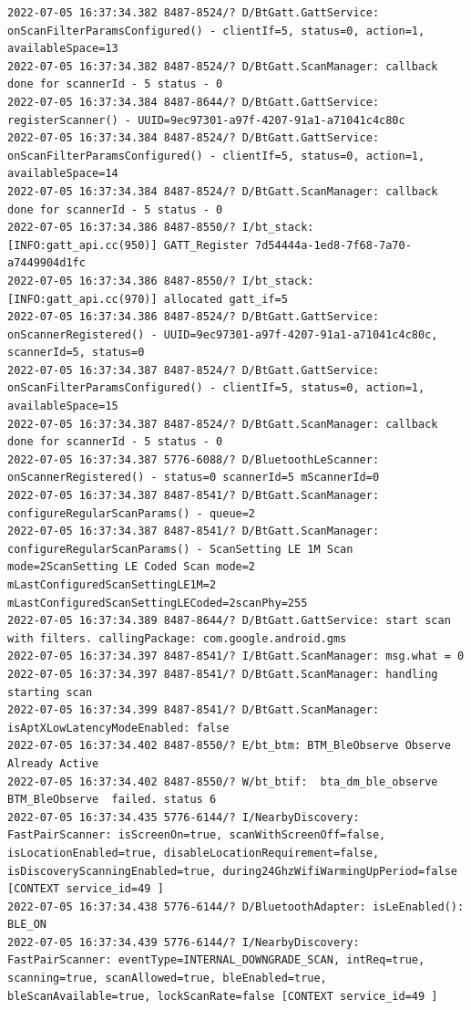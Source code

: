 \documentclass[a4paper,12pt]{book}
\begin{document}
\begin{lstlisting}
2022-07-05 16:37:34.382 8487-8524/? D/BtGatt.GattService: onScanFilterParamsConfigured() - clientIf=5, status=0, action=1, availableSpace=13
2022-07-05 16:37:34.382 8487-8524/? D/BtGatt.ScanManager: callback done for scannerId - 5 status - 0
2022-07-05 16:37:34.384 8487-8644/? D/BtGatt.GattService: registerScanner() - UUID=9ec97301-a97f-4207-91a1-a71041c4c80c
2022-07-05 16:37:34.384 8487-8524/? D/BtGatt.GattService: onScanFilterParamsConfigured() - clientIf=5, status=0, action=1, availableSpace=14
2022-07-05 16:37:34.384 8487-8524/? D/BtGatt.ScanManager: callback done for scannerId - 5 status - 0
2022-07-05 16:37:34.386 8487-8550/? I/bt_stack: [INFO:gatt_api.cc(950)] GATT_Register 7d54444a-1ed8-7f68-7a70-a7449904d1fc
2022-07-05 16:37:34.386 8487-8550/? I/bt_stack: [INFO:gatt_api.cc(970)] allocated gatt_if=5
2022-07-05 16:37:34.386 8487-8524/? D/BtGatt.GattService: onScannerRegistered() - UUID=9ec97301-a97f-4207-91a1-a71041c4c80c, scannerId=5, status=0
2022-07-05 16:37:34.387 8487-8524/? D/BtGatt.GattService: onScanFilterParamsConfigured() - clientIf=5, status=0, action=1, availableSpace=15
2022-07-05 16:37:34.387 8487-8524/? D/BtGatt.ScanManager: callback done for scannerId - 5 status - 0
2022-07-05 16:37:34.387 5776-6088/? D/BluetoothLeScanner: onScannerRegistered() - status=0 scannerId=5 mScannerId=0
2022-07-05 16:37:34.387 8487-8541/? D/BtGatt.ScanManager: configureRegularScanParams() - queue=2
2022-07-05 16:37:34.387 8487-8541/? D/BtGatt.ScanManager: configureRegularScanParams() - ScanSetting LE 1M Scan mode=2ScanSetting LE Coded Scan mode=2 mLastConfiguredScanSettingLE1M=2 mLastConfiguredScanSettingLECoded=2scanPhy=255
2022-07-05 16:37:34.389 8487-8644/? D/BtGatt.GattService: start scan with filters. callingPackage: com.google.android.gms
2022-07-05 16:37:34.397 8487-8541/? I/BtGatt.ScanManager: msg.what = 0
2022-07-05 16:37:34.397 8487-8541/? D/BtGatt.ScanManager: handling starting scan
2022-07-05 16:37:34.399 8487-8541/? D/BtGatt.ScanManager: isAptXLowLatencyModeEnabled: false
2022-07-05 16:37:34.402 8487-8550/? E/bt_btm: BTM_BleObserve Observe Already Active
2022-07-05 16:37:34.402 8487-8550/? W/bt_btif:  bta_dm_ble_observe BTM_BleObserve  failed. status 6
2022-07-05 16:37:34.435 5776-6144/? I/NearbyDiscovery: FastPairScanner: isScreenOn=true, scanWithScreenOff=false, isLocationEnabled=true, disableLocationRequirement=false, isDiscoveryScanningEnabled=true, during24GhzWifiWarmingUpPeriod=false [CONTEXT service_id=49 ]
2022-07-05 16:37:34.438 5776-6144/? D/BluetoothAdapter: isLeEnabled(): BLE_ON
2022-07-05 16:37:34.439 5776-6144/? I/NearbyDiscovery: FastPairScanner: eventType=INTERNAL_DOWNGRADE_SCAN, intReq=true, scanning=true, scanAllowed=true, bleEnabled=true, bleScanAvailable=true, lockScanRate=false [CONTEXT service_id=49 ]

\end{lstlisting}
\end{document}
